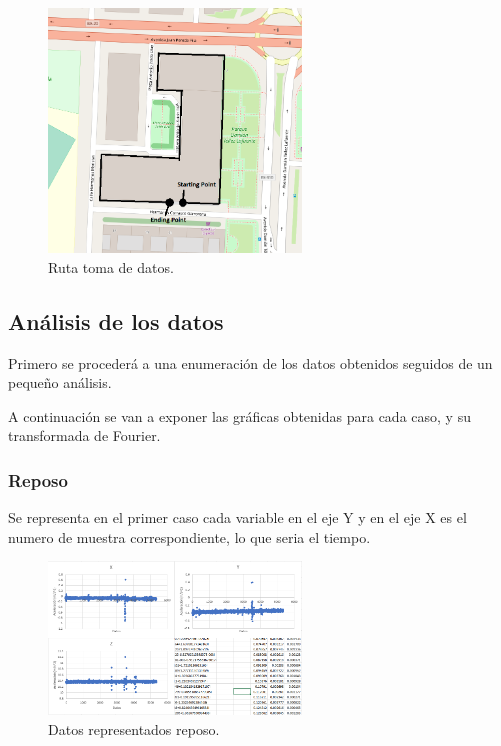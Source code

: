 \documentclass[12pt]{article}
\numberwithin{equation}{section}
\begin{document}
{\begin{figure}[h]
    \centering
    \includegraphics[width=0.6\textwidth]{plaza.png}
    \caption{Ruta toma de datos.}
    \label{fig:cuadra}
\end{figure}



\subsection{Análisis de los datos}
Primero se procederá a una enumeración de los datos obtenidos seguidos de un pequeño análisis.

A continuación se van a exponer las gráficas obtenidas para cada caso, y su transformada de Fourier.

\newpage

\subsubsection{Reposo}

Se representa en el primer caso cada variable en el eje Y y en el eje X es el numero de muestra correspondiente, lo que seria el tiempo.

\begin{figure}[h]
    \centering
    \includegraphics[width=0.6\textwidth]{reposoraw.png}
    \caption{Datos representados reposo.}
    \label{fig:reposoraw}
\end{figure}

}
\end{document}
